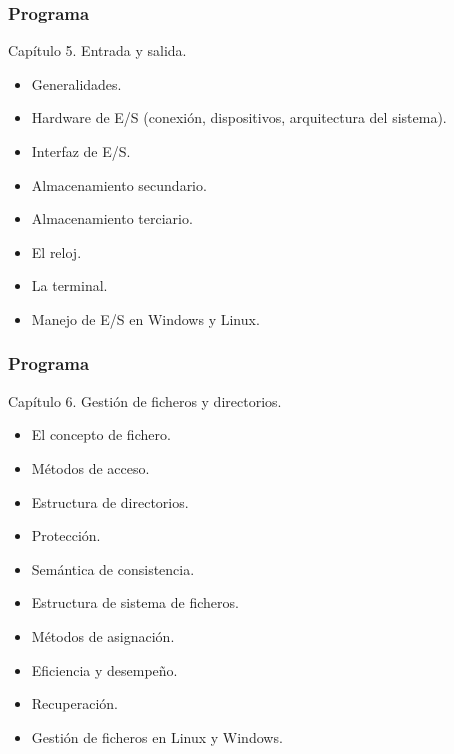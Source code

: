 \documentclass[xcolor=svgnames]{beamer}
\theoremstyle{example}
\begin{document}
\begin{frame}
  \frametitle{Programa}
  \begin{block}{Capítulo 5. Entrada y salida.}
    \begin{itemize}%
    \item Generalidades.
    \item Hardware de E/S (conexión, dispositivos, arquitectura del
      sistema).
    \item Interfaz de E/S.
    \item Almacenamiento secundario.
    \item Almacenamiento terciario.
    \item El reloj.
    \item La terminal.
    \item Manejo de E/S en Windows y Linux.
    \end{itemize}
  \end{block}
\end{frame}

\begin{frame}
  \frametitle{Programa}
  \begin{block}{Capítulo 6. Gestión de ficheros y directorios.}
    \begin{itemize}%
    \item El concepto de fichero.
    \item Métodos de acceso.
    \item Estructura de directorios.
    \item Protección.
    \item Semántica de consistencia.
    \item Estructura de sistema de ficheros.
    \item Métodos de asignación.
    \item Eficiencia y desempeño.
    \item Recuperación.
    \item Gestión de ficheros en Linux y Windows.
    \end{itemize}
  \end{block}
\end{frame}
\end{document}
